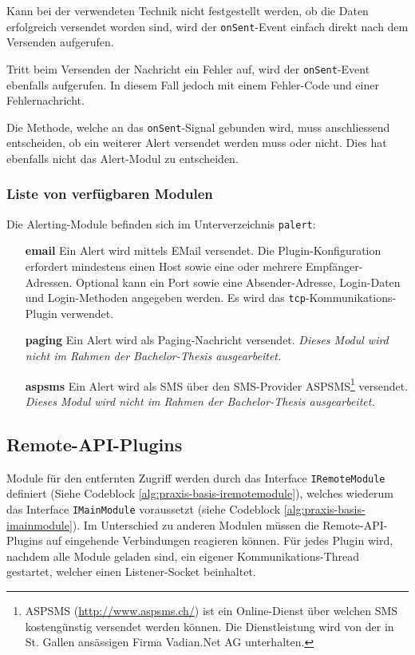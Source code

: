 Kann bei der verwendeten Technik nicht festgestellt werden, ob die Daten erfolgreich versendet worden sind, wird der \texttt{onSent}-Event einfach direkt nach dem Versenden aufgerufen.

Tritt beim Versenden der Nachricht ein Fehler auf, wird der \texttt{onSent}-Event ebenfalls aufgerufen. In diesem Fall jedoch mit einem Fehler-Code und einer Fehlernachricht.

Die Methode, welche an das \texttt{onSent}-Signal gebunden wird, muss anschliessend entscheiden, ob ein weiterer Alert versendet werden muss oder nicht. Dies hat ebenfalls nicht das Alert-Modul zu entscheiden.

\subsubsection{Liste von verf\"ugbaren Modulen} \label{sec:praxis-basis-alert-list}
Die Alerting-Module befinden sich im Unterverzeichnis \texttt{palert}:
\begin{itemize}
 \item[\textbf{email}] Ein Alert wird mittels EMail versendet. Die Plugin-Konfiguration erfordert mindestens einen Host sowie eine oder mehrere Empf\"anger-Adressen. Optional kann ein Port sowie eine Absender-Adresse, Login-Daten und Login-Methoden angegeben werden. Es wird das \texttt{tcp}-Kommunikations-Plugin verwendet.

 \item[\textbf{paging}] Ein Alert wird als Paging-Nachricht versendet. \textit{Dieses Modul wird nicht im Rahmen der Bachelor-Thesis ausgearbeitet.}

 \item[\textbf{aspsms}] Ein Alert wird als SMS \"uber den SMS-Provider ASPSMS\footnote{ASPSMS (\url{http://www.aspsms.ch/}) ist ein Online-Dienst \"uber welchen SMS kosteng\"unstig versendet werden k\"onnen. Die Dienstleistung wird von der in St. Gallen ans\"assigen Firma Vadian.Net AG unterhalten.} versendet. \textit{Dieses Modul wird nicht im Rahmen der Bachelor-Thesis ausgearbeitet.}
\end{itemize}

\subsection{Remote-API-Plugins} \label{sec:praxis-basis-remote}
Module f\"ur den entfernten Zugriff werden durch das Interface \texttt{IRemoteModule} definiert (Siehe Codeblock \ref{alg:praxis-basis-iremotemodule}), welches wiederum das Interface \texttt{IMainModule} voraussetzt (siehe Codeblock \ref{alg:praxis-basis-imainmodule}). Im Unterschied zu anderen Modulen m\"ussen die Remote-API-Plugins auf eingehende Verbindungen reagieren k\"onnen. F\"ur jedes Plugin wird, nachdem alle Module geladen sind, ein eigener Kommunikations-Thread gestartet, welcher einen Listener-Socket beinhaltet.

